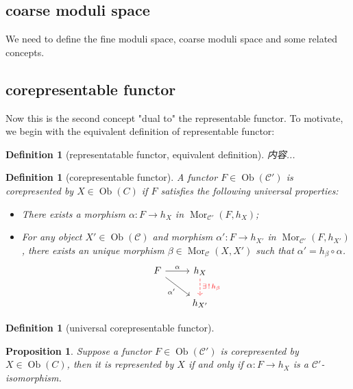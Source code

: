 \documentclass[reqno,11pt]{amsart}
\numberwithin{equation}{section}
\theoremstyle{plain}
\newtheorem{proposition}[theorem]{Proposition}
\newtheorem{defn}[theorem]{Definition}
\theoremstyle{plain}
\numberwithin{equation}{section}
\theoremstyle{remark}
\newcommand{\Ob}{\operatorname{Ob}}
\newcommand{\Mor}{\operatorname{Mor}}
\begin{document}
\subsection{coarse moduli space}
We need to define the fine moduli space, coarse moduli space and some related concepts.
\subsection{corepresentable functor}
Now this is the second concept "dual to" the representable functor. To motivate, we begin with the equivalent definition of representable functor:
\begin{defn}[representatable functor, equivalent definition]
内容...
\end{defn}
\begin{defn}[corepresentable functor]
A functor $F\in \Ob(\mathcal{C}')$ is corepresented by $X \in \Ob(C)$ if $F$ satisfies the following universal properties:
\begin{itemize}
\item There exists a morphism $\alpha:F \longrightarrow h_X$ in $\Mor_{\mathcal{C}'}(F,h_X)$;
\item For any object $X' \in \Ob(\mathcal{C})$ and morphism $\alpha':F\longrightarrow h_{X'}$ in $\Mor_{\mathcal{C}'}(F,h_{X'})$, there exists an unique morphism $\beta \in \Mor_{\mathcal{C}}(X,X')$ such that $\alpha'=h_{\beta} \circ \alpha$.
$$\begin{tikzcd}
	F & {h_X} \\
	& {h_{X'}}
	\arrow["\alpha", from=1-1, to=1-2]
	\arrow["{\exists \,! \,h_{\beta}}", color={rgb,255:red,255;green,0;blue,8}, dashed, from=1-2, to=2-2]
	\arrow["{\alpha'}"', from=1-1, to=2-2]
\end{tikzcd}$$
\end{itemize}
\end{defn}
\begin{defn}[universal corepresentable functor]

\end{defn}
\begin{proposition}
Suppose a functor $F\in \Ob(\mathcal{C}')$ is corepresented by $X \in \Ob(C)$, then it is represented by $X$ if and only if $\alpha:F \longrightarrow h_X$ is a $\mathcal{C}'$-isomorphism.
\end{proposition}
\end{document}
